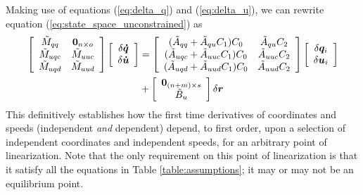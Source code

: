 \documentclass[smallcondensed,final]{svjour3}                     %
\begin{document}
Making use of equations (\ref{eq:delta_q}) and (\ref{eq:delta_u}), we can
rewrite equation (\ref{eq:state_space_unconstrained}) as
\begin{align}
  \label{eq:state_space_constrained}
  \left[
    \begin{array}{cc}
      \tilde{M}_{qq} & \bm{0}_{n \times o} \\
      \tilde{M}_{uqc} & \tilde{M}_{uuc} \\
      \tilde{M}_{uqd} & \tilde{M}_{uud}
    \end{array}
    \right]
    \left[
      \begin{array}{c}
        \delta \bm{\dot{q}} \\
        \delta \bm{\dot{u}}
      \end{array}
    \right]
   &=
   \left[
     \begin{array}{cc}
       (\tilde{A}_{qq} + \tilde{A}_{qu} C_1 ) C_0 & \tilde{A}_{qu} C_2 \\
       (\tilde{A}_{uqc} + \tilde{A}_{uuc} C_1 ) C_0 & \tilde{A}_{uuc} C_2\\
       (\tilde{A}_{uqd} + \tilde{A}_{uud} C_1 ) C_0 & \tilde{A}_{uud} C_2
     \end{array}
   \right]
    \left[
      \begin{array}{c}
        \delta \bm{q}_i \\
        \delta \bm{u}_i
      \end{array}
    \right]
    \notag \\
    &+\left[
      \begin{array}{c}
        \bm{0}_{(n+m) \times s} \\
        \tilde{B}_{u}
      \end{array}
    \right]
    \delta \bm{r}
\end{align}
This definitively establishes how the first time derivatives of coordinates and
speeds (independent \textit{and} dependent) depend, to first order, upon a
selection of independent coordinates and independent speeds, for an arbitrary
point of linearization. Note that the only requirement on this point of
linearization is that it satisfy all the equations in Table
\ref{table:assumptions}; it may or may not be an equilibrium point.
\end{document}
